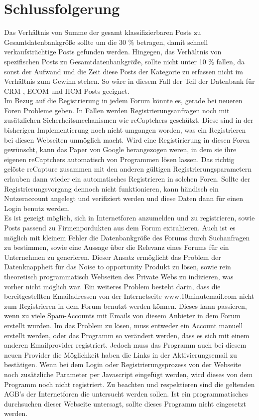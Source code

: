 \section{Schlussfolgerung}
Das Verhältnis von Summe der gesamt klassifizierbaren Posts zu Gesamtdatenbankgröße sollte um die 30 \% betragen, damit schnell verkaufsträchtige Posts gefunden werden. Hingegen, das Verhältnis von spezifischen Posts zu Gesamtdatenbankgröße, sollte nicht unter 10 \% fallen, da sonst der Aufwand und die Zeit diese Posts der Kategorie zu erfassen nicht im Verhältnis zum Gewinn stehen. So wäre in diesem Fall der Teil der Datenbank für CRM , ECOM und HCM Posts geeignet.\\
Im Bezug auf die Registrierung in jedem Forum könnte es, gerade bei neueren Foren Probleme geben. In Fällen werden Registrierungsanfragen noch mit zusätzlichen Sicherheitsmechanismen wie reCaptchers geschützt. Diese sind in der bisherigen Implementierung noch nicht umgangen worden, was ein Registrieren bei diesen Webseiten unmöglich macht. Wird eine Registirierung in diesen Foren gewünscht, kann das Paper von Google herangezogen weren, in dem sie ihre eigenen reCaptchers automatisch von Programmen lösen lassen. Das richtig gelöste reCapture zusammen mit den anderen gültigen Registrierungsparametern erlauben dann wieder ein automatisches Registrieren in solchen Foren. Sollte der Registrierungsvorgang dennoch nicht funktionieren, kann händisch ein Nutzeraccount angelegt und verifiziert werden und diese Daten dann für einen Login benutz werden.\\
Es ist gezeigt möglich, sich in Internetforen anzumelden und zu registrieren, sowie Posts passend zu Firmenpordukten aus dem Forum extrahieren.
Auch ist es möglich mit kleinem Fehler die Datenbankgröße des Forums durch Suchanfragen zu bestimmen, sowie eine Aussage über die Relevanz eines Forums für ein Unternehmen zu generieren. Dieser Ansatz ermöglicht das Problem der Datenknappheit für das Noise to opportunity Produkt zu lösen, sowie rein theoretisch programmatisch Webseiten des Private Webs zu indizieren, was vorher nicht möglich war. Ein weiteres Problem besteht darin, dass die bereitgestellten Emailadressen von der Internetseite www.10minutemail.com nicht zum Registrieren in dem Forum benutzt werden können. Dieses kann passieren, wenn zu viele Spam-Accounts mit Emails von diesem Anbieter in dem Forum erstellt wurden. Im das Problem zu lösen, muss entweder ein Account manuell erstellt werden, oder das Programm so verändert werden, dass es sich mit einem anderen Emailprovider registriert. Jedoch muss das Programm auch bei diesem neuen Provider die Möglichkeit haben die Links in der Aktivierungsemail zu bestätigen.
Wenn bei dem Login oder Registrierungsprozess von der Webseite noch zusätzliche Parameter per Javascript eingefügt werden, wird dieses von dem Programm noch nicht registriert.
Zu beachten und respektieren sind die geltenden AGB's der Internetforen die untersucht werden sollen. Ist ein programmatisches durchsuchen dieser Webseite untersagt, sollte dieses Programm nicht eingesetzt werden.
